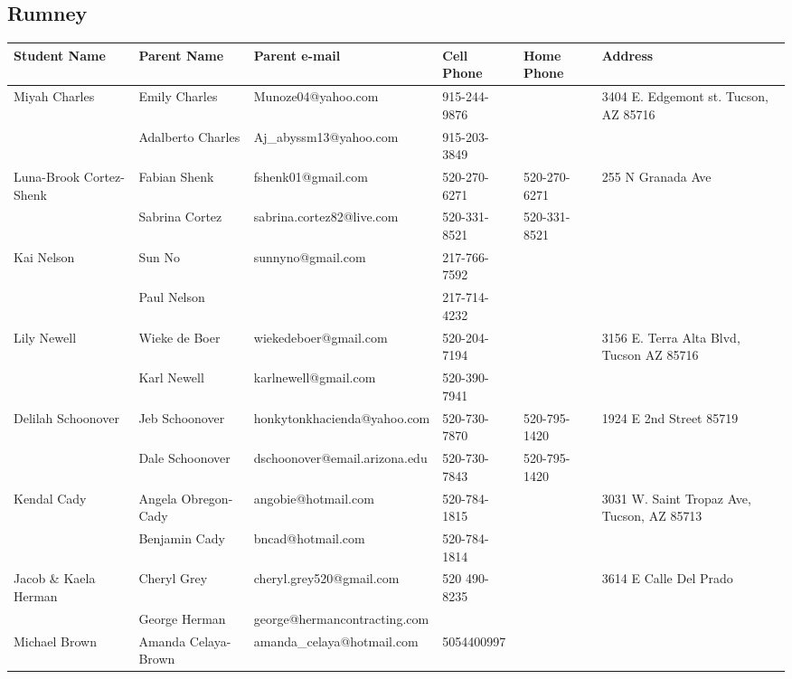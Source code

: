 \documentclass[landscape]{article}\usepackage[]{graphicx}\usepackage[]{color}
\begin{document}
\subsection{Rumney}
\begin{longtable}{p{70pt}|p{75pt}|p{120pt}|p{60pt}|p{60pt}|p{120pt}|}
Student Name & Parent Name & Parent e-mail & Cell Phone & Home Phone & Address\\
\hline
\multirow{2}{70pt}{Miyah Charles} & Emily Charles & Munoze04@yahoo.com & 915-244-9876 &  & \multirow{2}{100pt}{3404 E. Edgemont st. Tucson, AZ 85716} \\
 & Adalberto Charles & Aj\_abyssm13@yahoo.com & 915-203-3849 &  & \\
\hline
\multirow{2}{70pt}{Luna-Brook Cortez-Shenk} & Fabian Shenk & fshenk01@gmail.com & 520-270-6271 & 520-270-6271 & \multirow{2}{100pt}{255 N Granada Ave} \\
 & Sabrina Cortez & sabrina.cortez82@live.com & 520-331-8521 & 520-331-8521 & \\
\hline
\multirow{2}{70pt}{Kai Nelson} & Sun No & sunnyno@gmail.com & 217-766-7592 &  & \multirow{2}{100pt}{} \\
 & Paul Nelson &  & 217-714-4232 &  & \\
\hline
\multirow{2}{70pt}{Lily Newell} & Wieke de Boer & wiekedeboer@gmail.com & 520-204-7194 &  & \multirow{2}{100pt}{3156 E. Terra Alta Blvd, Tucson AZ 85716} \\
 & Karl Newell & karlnewell@gmail.com & 520-390-7941 &  & \\
\hline
\multirow{2}{70pt}{Delilah Schoonover} & Jeb Schoonover & honkytonkhacienda@yahoo.com & 520-730-7870 & 520-795-1420 & \multirow{2}{100pt}{1924 E 2nd Street 85719} \\
 & Dale Schoonover & dschoonover@email.arizona.edu & 520-730-7843 & 520-795-1420 & \\
\hline
\multirow{2}{70pt}{Kendal Cady} & Angela Obregon-Cady & angobie@hotmail.com & 520-784-1815 &  & \multirow{2}{100pt}{3031 W. Saint Tropaz Ave, Tucson, AZ 85713} \\
 & Benjamin Cady & bncad@hotmail.com & 520-784-1814 &  & \\
\hline
\multirow{2}{70pt}{Jacob \& Kaela Herman} & Cheryl Grey & cheryl.grey520@gmail.com & 520 490-8235 &  & \multirow{2}{100pt}{3614 E Calle Del Prado} \\
 & George Herman & george@hermancontracting.com &  &  & \\
\hline
\multirow{2}{70pt}{Michael Brown} & Amanda Celaya-Brown & amanda\_celaya@hotmail.com & 5054400997 &  & \multirow{2}{100pt}{} \\

\end{longtable}
\end{document}
